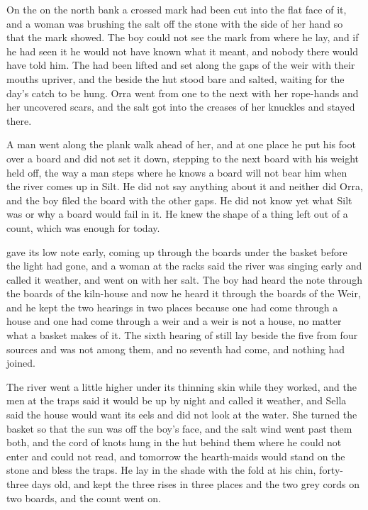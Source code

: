 On the  on the north bank a crossed mark had been cut into the flat face of it, and a woman was brushing the salt off the stone with the side of her hand so that the mark showed. The boy could not see the mark from where he lay, and if he had seen it he would not have known what it meant, and nobody there would have told him. The  had been lifted and set along the gaps of the weir with their mouths upriver, and the  beside the hut stood bare and salted, waiting for the day's catch to be hung. Orra went from one to the next with her rope-hands and her uncovered scars, and the salt got into the creases of her knuckles and stayed there.

A man went along the plank walk ahead of her, and at one place he put his foot over a board and did not set it down, stepping to the next board with his weight held off, the way a man steps where he knows a board will not bear him when the river comes up in Silt. He did not say anything about it and neither did Orra, and the boy filed the board with the other gaps. He did not know yet what Silt was or why a board would fail in it. He knew the shape of a thing left out of a count, which was enough for today.

 gave its low note early, coming up through the boards under the basket before the light had gone, and a woman at the racks said the river was singing early and called it weather, and went on with her salt. The boy had heard the note through the boards of the kiln-house and now he heard it through the boards of the Weir, and he kept the two hearings in two places because one had come through a house and one had come through a weir and a weir is not a house, no matter what a basket makes of it. The sixth hearing of  still lay beside the five from four sources and was not among them, and no seventh had come, and nothing had joined.

The river went a little higher under its thinning skin while they worked, and the men at the traps said it would be up by night and called it weather, and Sella said the house would want its eels and did not look at the water. She turned the basket so that the sun was off the boy's face, and the salt wind went past them both, and the cord of knots hung in the hut behind them where he could not enter and could not read, and tomorrow the hearth-maids would stand on the stone and bless the traps. He lay in the shade with the fold at his chin, forty-three days old, and kept the three rises in three places and the two grey cords on two boards, and the count went on.
